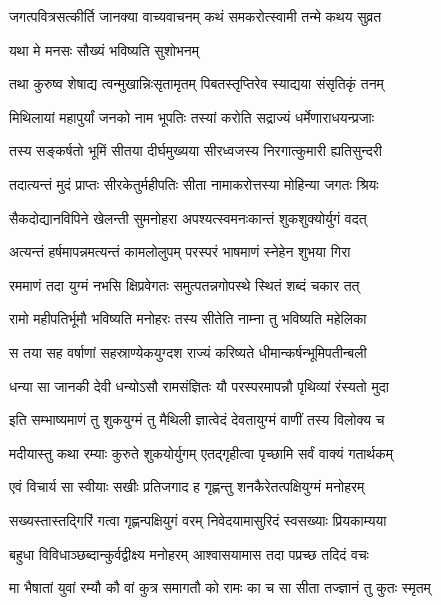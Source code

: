 \twolineshloka
{जगत्पवित्रसत्कीर्ति जानक्या वाच्यवाचनम्}
{कथं समकरोत्स्वामी तन्मे कथय सुव्रत}%

यथा मे मनसः सौख्यं भविष्यति सुशोभनम्

\twolineshloka
{तथा कुरुष्व शेषाद्य त्वन्मुखान्निःसृतामृतम्}
{पिबतस्तृप्तिरेव स्याद्यया संसृतिकृं तनम्}%


\twolineshloka
{मिथिलायां महापुर्यां जनको नाम भूपतिः}
{तस्यां करोति सद्राज्यं धर्मेणाराधयन्प्रजाः}%

\twolineshloka
{तस्य सङ्कर्षतो भूमिं सीतया दीर्घमुख्यया}
{सीरध्वजस्य निरगात्कुमारी ह्यतिसुन्दरी}%

\twolineshloka
{तदात्यन्तं मुदं प्राप्तः सीरकेतुर्महीपतिः}
{सीता नामाकरोत्तस्या मोहिन्या जगतः श्रियः}%

\twolineshloka
{सैकदोद्यानविपिने खेलन्ती सुमनोहरा}
{अपश्यत्स्वमनःकान्तं शुकशुक्योर्युगं वदत्}%

\twolineshloka
{अत्यन्तं हर्षमापन्नमत्यन्तं कामलोलुपम्}
{परस्परं भाषमाणं स्नेहेन शुभया गिरा}%

\twolineshloka
{रममाणं तदा युग्मं नभसि क्षिप्रवेगतः}
{समुत्पतन्नगोपस्थे स्थितं शब्दं चकार तत्}%

\twolineshloka
{रामो महीपतिर्भूमौ भविष्यति मनोहरः}
{तस्य सीतेति नाम्ना तु भविष्यति महेलिका}%

\twolineshloka
{स तया सह वर्षाणां सहस्राण्येकयुग्दश}
{राज्यं करिष्यते धीमान्कर्षन्भूमिपतीन्बली}%

\twolineshloka
{धन्या सा जानकी देवी धन्योऽसौ रामसंज्ञितः}
{यौ परस्परमापन्नौ पृथिव्यां रंस्यतो मुदा}%

\twolineshloka
{इति सम्भाष्यमाणं तु शुकयुग्मं तु मैथिली}
{ज्ञात्वेदं देवतायुग्मं वाणीं तस्य विलोक्य च}%

\twolineshloka
{मदीयास्तु कथा रम्याः कुरुते शुकयोर्युगम्}
{एतद्गृहीत्वा पृच्छामि सर्वं वाक्यं गतार्थकम्}%

\twolineshloka
{एवं विचार्य सा स्वीयाः सखीः प्रतिजगाद ह}
{गृह्णन्तु शनकैरेतत्पक्षियुग्मं मनोहरम्}%

\twolineshloka
{सख्यस्तास्तद्गिरिं गत्वा गृह्णन्पक्षियुगं वरम्}
{निवेदयामासुरिदं स्वसख्याः प्रियकाम्यया}%

\twolineshloka
{बहुधा विविधाञ्छब्दान्कुर्वद्वीक्ष्य मनोहरम्}
{आश्वासयामास तदा पप्रच्छ तदिदं वचः}%


\twolineshloka
{मा भैषातां युवां रम्यौ कौ वां कुत्र समागतौ}
{को रामः का च सा सीता तज्ज्ञानं तु कुतः स्मृतम्}%

